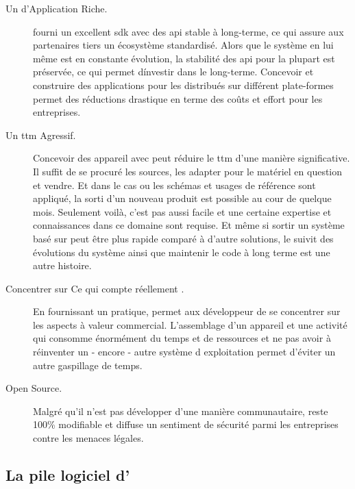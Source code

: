 \begin{description}

\item [Un  d'Application Riche.] \android{} fourni un
excellent \gls{sdk} avec des \gls{api} stable à long-terme, ce qui
assure aux partenaires tiers un écosystème standardisé. Alors que le
système en lui même est en constante évolution, la stabilité des
\gls{api} pour la plupart est préservée, ce qui permet d\'investir dans
le long-terme. Concevoir et construire des applications pour les
distribués sur différent plate-formes permet des réductions drastique en
terme des coûts et effort pour les entreprises.

\item [Un \gls{ttm} Agressif.] Concevoir des appareil avec \android{}
peut réduire le \gls{ttm} d'une manière significative. Il suffit de se
procuré les sources, les adapter pour le matériel en question et vendre. Et dans le cas ou les schémas et usages de référence sont
appliqué, la sorti d'un nouveau produit est possible au cour de quelque
mois. Seulement voilà, c'est pas aussi facile et une certaine expertise
et connaissances dans ce domaine sont requise. Et même si sortir un
système basé sur \android{} peut être plus rapide comparé à d'autre
solutions, le suivit des évolutions du système ainsi que maintenir le
code à long terme est une autre histoire.

\item [Concentrer sur \og Ce qui compte réellement \fg.] En fournissant
un  pratique, \android{} permet aux développeur de se
concentrer sur les aspects à valeur commercial. L'assemblage d'un
appareil et une activité qui consomme énormément du temps et de
ressources et ne pas avoir à réinventer un - encore - autre système d
exploitation permet d'éviter un autre gaspillage de temps.

\item [Open Source.] Malgré qu'il n'est pas développer d'une manière
communautaire, \android{} reste 100\% modifiable et diffuse un sentiment
de sécurité parmi les entreprises contre les menaces légales.

\end{description}

\subsection[La pile logiciel d'\android{}]{La pile logiciel d'\android{}\cite{pa4ad:chptr1}}


